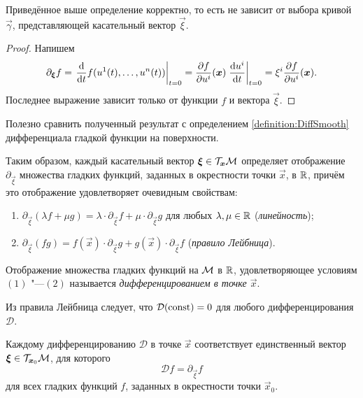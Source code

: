 \begin{proposition}
	Приведённое выше определение корректно, то есть не зависит от выбора кривой $\vec{\gamma}$, представляющей касательный вектор $\vec{\xi}$.
\end{proposition}

\begin{proof}
	Напишем
	\[
		\partial_{\boldsymbol{\xi}}f = \left.\frac{\mathop{}\!\mathrm{d}}{\mathop{}\!\mathrm{d} t}f(u^1(t), \ldots, u^n(t))\right|_{t = 0} = \frac{\partial f}{\partial u^i}(\boldsymbol{x})\left.\frac{\mathop{}\!\mathrm{d} u^i}{\mathop{}\!\mathrm{d} t}\right|_{t = 0} = \xi^i\frac{\partial f}{\partial u^i}(\boldsymbol{x}).
	\]
	Последнее выражение зависит только от функции $f$ и вектора $\vec{\xi}$.
\end{proof}

Полезно сравнить полученный результат с определением \ref{definition:DiffSmooth} дифференциала гладкой функции на поверхности.

Таким образом, каждый касательный вектор $\boldsymbol{\xi} \in \mathcal{T}_{\boldsymbol{x}}\mathcal{M}$ определяет отображение $\partial_{\vec{\xi}}$ множества гладких функций, заданных в окрестности точки $\vec{x}$, в $\mathbb{R}$, причём это отображение удовлетворяет очевидным свойствам:
\begin{enumerate}[nolistsep, label=(\arabic*)]
	\item $\partial_{\vec{\xi}}(\lambda f + \mu g) = \lambda \cdot \partial_{\vec{\xi}}f + \mu \cdot \partial_{\vec{\xi}}g$ для любых $\lambda, \mu \in \mathbb{R}$ (\textit{линейность});
	\item $\partial_{\vec{\xi}}(fg) = f(\vec{x}) \cdot \partial_{\vec{\xi}}g + g(\vec{x}) \cdot \partial_{\vec{\xi}}f$ (\textit{правило Лейбница}).
\end{enumerate}

\begin{definition}
	Отображение множества гладких функций на $\mathcal{M}$ в $\mathbb{R}$, удовлетворяющее условиям $(1)$ "---$(2)$ называется \textit{дифференцированием в точке $\vec{x}$}.
\end{definition}

Из правила Лейбница следует, что $\mathcal{D}(\mathrm{const}) = 0$ для любого дифференцирования $\mathcal{D}$.

\begin{theorem}
	Каждому дифференцированию $\mathcal{D}$ в точке $\vec{x}$ соответствует единственный вектор $\boldsymbol{\xi} \in \mathcal{T}_{\boldsymbol{x}_0}\mathcal{M}$, для которого
	\[
		\mathcal{D} f = \partial_{\vec{\xi}}f
	\]
	для всех гладких функций $f$, заданных в окрестности точки $\vec{x}_0$.
\end{theorem}

